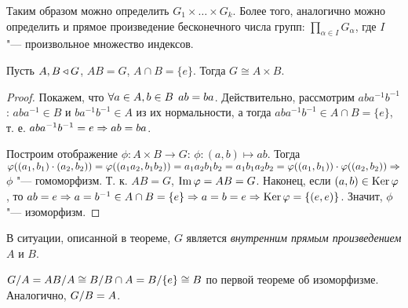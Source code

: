 \documentclass[main]{subfiles}
\begin{document}
\begin{remark}
  Таким образом можно определить
  \( G_1 \times \dots \times G_k \).
  Более того, аналогично можно определить
  и  прямое произведение бесконечного
  числа групп: \( \prod_{\alpha \in I} G_\alpha \),
  где \( I \) "--- произвольное множество индексов.
\end{remark}

\begin{theorem}
  Пусть \( A, B \triangleleft G \), \( AB = G \),
  \( A \cap B = \{ e \} \).
  Тогда \( G \cong A \times B \).
\end{theorem}
\begin{proof}
  Покажем, что \( \forall {a \in A, b \in B} \; \, ab = ba \).
  Действительно, рассмотрим
  \( a b a^{-1} b^{-1} \):
  \( a b a^{-1} \in B \) и \( b a^{-1} b^{-1} \in A \)
  из их нормальности,
  а тогда \( a b a^{-1} b^{-1} \in A \cap B = \{ e \} \),
  т. е. \( ab a^{-1} b^{-1} = e \Rightarrow
  ab = ba \).

  Построим отображение
  \( \phi : A \times B \to G \):
  \( \phi : (a, b) \mapsto a b \).
  Тогда \( \varphi((a_1, b_1) \cdot (a_2, b_2)) =
  \varphi((a_1 a_2, b_1 b_2)) = a_1 a_2 b_1 b_2 =
  a_1 b_1 a_2 b_2 = \varphi((a_1, b_1)) \cdot \varphi((a_2, b_2)) \Rightarrow \)
  \( \phi \) "--- гомоморфизм.
  Т. к. \( AB = G \), \( \operatorname{Im} \varphi = AB = G \).
  Наконец, если \( (a, b) \in \operatorname{Ker} \varphi \),
  то \( ab = e \Rightarrow a = b^{-1} \in A \cap B = \{ e \}
  \Rightarrow a = b = e \Rightarrow \operatorname{Ker} \varphi = \{ (e, e) \} \).
  Значит, \( \phi \) "--- изоморфизм.
\end{proof}

\begin{definition}
  В ситуации, описанной в теореме,
  \( G \) является
  \emph{внутренним прямым произведением}
  \( A \) и \( B \).
\end{definition}

\begin{remark}
  \( \Factor{G}[A] = \Factor{AB}[A] \cong
  \Factor{B}[B \cap A] = \Factor{B}[\{ e \}] \cong B \)
  по первой теореме об изоморфизме.
  Аналогично, \( \Factor{G}[B] = A \).
\end{remark}
\end{document}
